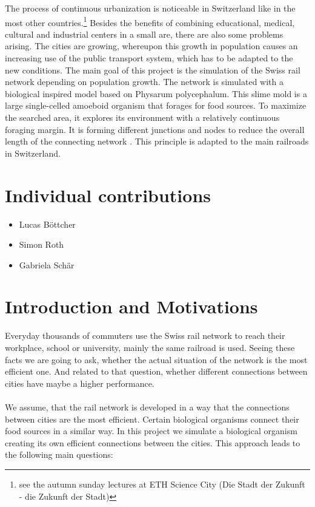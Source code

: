 \documentclass[11pt]{scrartcl}
\begin{document}
The process of continuous urbanization is noticeable in Switzerland like in the most other countries.\footnote[1]{see the autumn sunday lectures at ETH Science City (Die Stadt der Zukunft - die Zukunft der Stadt)} Besides the benefits of combining educational, medical, cultural and industrial centers in a small are, there are also some problems arising. The cities are growing, whereupon this growth in population causes an increasing use of the public transport system, which has to be adapted to the new conditions. The main goal of this project is the simulation of the Swiss rail network depending on population growth. The network is simulated with a biological inspired model based on Physarum polycephalum. This slime mold is a large single-celled amoeboid organism that forages for food sources. To maximize the searched area, it explores its environment with a relatively continuous foraging margin. It is forming different junctions and nodes to reduce the overall length of the connecting network \cite{network_tokyo}. This principle is adapted to the main railroads in Switzerland. 


\section{Individual contributions}
\begin{itemize}
  \item Lucas Böttcher
  \item Simon Roth
  \item Gabriela Schär
\end{itemize}


\section{Introduction and Motivations}
\label{sec:introduction}
Everyday thousands of commuters use the Swiss rail network to reach their workplace, school or university, mainly the same railroad is used. Seeing these facts we are going to ask, whether the actual situation of the network is the most efficient one. And related to that question, whether different connections between cities have maybe a higher performance.\\
\\
We assume, that the rail network is developed in a way that the connections between cities are the most efficient. Certain biological organisms connect their food sources in a similar way. In this project we simulate a biological organism creating its own efficient connections between the cities. This approach leads to the following main questions:
\end{document}
